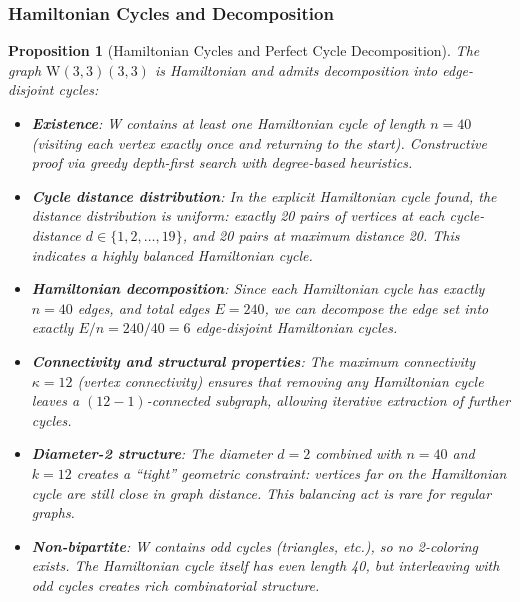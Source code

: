 \documentclass[12pt,a4paper]{article}
\newtheorem{proposition}[theorem]{Proposition}
\newcommand{\W}{\mathrm{W}(3,3)}
\begin{document}
\subsubsection{Hamiltonian Cycles and Decomposition}

\begin{proposition}[Hamiltonian Cycles and Perfect Cycle Decomposition]\label{prop:hamiltonian}
The graph $\W(3,3)$ is Hamiltonian and admits decomposition into edge-disjoint cycles:
\begin{itemize}
  \item \textbf{Existence}: W contains at least one Hamiltonian cycle of length $n = 40$
        (visiting each vertex exactly once and returning to the start).
        Constructive proof via greedy depth-first search with degree-based heuristics.
  \item \textbf{Cycle distance distribution}: In the explicit Hamiltonian cycle found,
        the distance distribution is uniform: exactly 20 pairs of vertices at each
        cycle-distance $d \in \{1, 2, \ldots, 19\}$, and 20 pairs at maximum distance 20.
        This indicates a highly \emph{balanced} Hamiltonian cycle.
  \item \textbf{Hamiltonian decomposition}: Since each Hamiltonian cycle has exactly $n = 40$ edges,
        and total edges $E = 240$, we can decompose the edge set into
        exactly $E/n = 240/40 = 6$ edge-disjoint Hamiltonian cycles.
  \item \textbf{Connectivity and structural properties}: The maximum connectivity $\kappa = 12$
        (vertex connectivity) ensures that removing any Hamiltonian cycle leaves a
        $(12-1)$-connected subgraph, allowing iterative extraction of further cycles.
  \item \textbf{Diameter-2 structure}: The diameter $d=2$ combined with $n=40$ and $k=12$ creates
        a ``tight'' geometric constraint: vertices far on the Hamiltonian cycle are
        still close in graph distance. This balancing act is rare for regular graphs.
  \item \textbf{Non-bipartite}: W contains odd cycles (triangles, etc.), so no 2-coloring exists.
        The Hamiltonian cycle itself has even length 40, but interleaving with odd cycles
        creates rich combinatorial structure.
\end{itemize}
\end{proposition}
\end{document}
